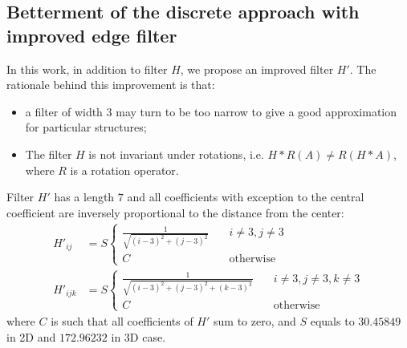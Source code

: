 \documentclass[1p]{elsarticle}
\begin{document}
\subsection{Betterment of the discrete approach with improved edge filter}
In this work, in addition to filter $H$, we propose an improved filter $H'$. The
rationale behind this improvement is that:
\begin{itemize}
\item a filter of width 3 may turn to be too narrow to give a good approximation
  for particular structures;
\item The filter $H$ is not invariant under rotations, i.e.
  $H*R(A) \ne R(H*A)$, where $R$ is a rotation operator.
\end{itemize}
Filter $H'$ has a length $7$ and all coefficients with exception to the central
coefficient are inversely proportional to the distance from the center:
\begin{equation}
  \begin{aligned}
    H'_{ij} &= S \left\{
    \begin{array}{cc}
      \frac{1}{\sqrt{(i-3)^2 + (j-3)^2}} & \quad i \ne 3, j \ne 3 \\
      C & \quad \text{otherwise}
    \end{array}
    \right. \\
    H'_{ijk} &= S \left\{
    \begin{array}{cc}
      \frac{1}{\sqrt{(i-3)^2 + (j-3)^2 + (k-3)^3}} & \quad i \ne 3, j \ne 3, k
      \ne 3 \\
      C & \quad \text{otherwise}
    \end{array}
    \right.
  \end{aligned}
  \label{eq:filter-7x7}
\end{equation}
where $C$ is such that all coefficients of $H'$ sum to zero, and $S$ equals to
$30.45849$ in 2D and $172.96232$ in 3D case.
\end{document}

